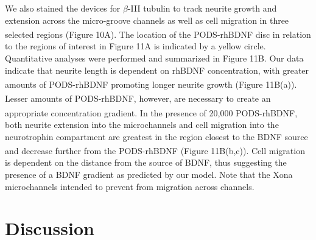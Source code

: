 \documentclass[review]{elsarticle}
\begin{document}
We also stained the devices for $\beta$-III tubulin to track neurite growth and extension across the micro-groove channels as well as cell migration in three selected regions (Figure 10A). The location of the PODS\textsuperscript{\textregistered}-rhBDNF disc in relation to the regions of interest in Figure 11A is indicated by a yellow circle. Quantitative analyses were performed and summarized in Figure 11B. Our data indicate that neurite length is dependent on rhBDNF concentration, with greater amounts of PODS\textsuperscript{\textregistered}-rhBDNF promoting longer neurite growth (Figure 11B(a)). Lesser amounts of PODS\textsuperscript{\textregistered}-rhBDNF, however, are necessary to create an appropriate concentration gradient. In the presence of 20,000 PODS\textsuperscript{\textregistered}-rhBDNF, both neurite extension into the microchannels and cell migration into the neurotrophin compartment are greatest in the region closest to the BDNF source and decrease further from the PODS\textsuperscript{\textregistered}-rhBDNF (Figure 11B(b,c)). Cell migration is dependent on the distance from the source of BDNF, thus suggesting the presence of a BDNF gradient as predicted by our model. Note that the Xona microchannels intended to prevent from migration across channels. 


\section {Discussion}%
\end{document}
